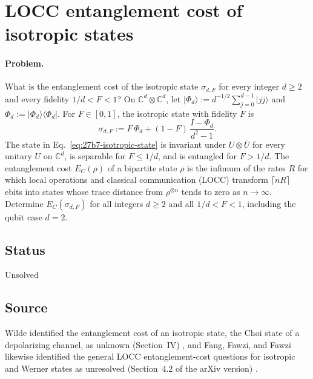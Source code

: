 \section{LOCC entanglement cost of isotropic states}
\label{sec:op_27b7826ed57e893a}

\paragraph{Problem.}
What is the entanglement cost of the isotropic state $\sigma_{d,F}$ for every
integer $d\geq2$ and every fidelity $1/d<F<1$?  On
$\mathbb C^d\otimes\mathbb C^d$, let
$\lvert\Phi_d\rangle:=d^{-1/2}\sum_{j=0}^{d-1}\lvert jj\rangle$ and
$\Phi_d:=\lvert\Phi_d\rangle\!\langle\Phi_d\rvert$.  For $F\in[0,1]$, the
isotropic state with fidelity $F$ is
\begin{equation}
  \sigma_{d,F}:=F\,\Phi_d+(1-F)\,\frac{I-\Phi_d}{d^2-1}.
  \label{eq:27b7-isotropic-state}
\end{equation}
The state in Eq.~\eqref{eq:27b7-isotropic-state} is invariant under
$U\otimes\overline U$ for every unitary $U$ on $\mathbb C^d$, is separable for
$F\leq1/d$, and is entangled for $F>1/d$.  The entanglement cost $E_C(\rho)$
of a bipartite state $\rho$ is the infimum of the rates $R$ for which local
operations and classical communication (LOCC) transform $\lceil nR\rceil$
ebits into states whose trace distance from $\rho^{\otimes n}$ tends to zero
as $n\to\infty$.  Determine $E_C(\sigma_{d,F})$ for all integers $d\geq2$ and
all $1/d<F<1$, including the qubit case $d=2$.

\subsection*{Status}

Unsolved

\subsection*{Source}

Wilde identified the entanglement cost of an isotropic state, the Choi state
of a depolarizing channel, as unknown (Section~IV)
, and Fang, Fawzi, and Fawzi likewise identified the general LOCC
entanglement-cost questions for isotropic and Werner states as unresolved
(Section~4.2 of the arXiv version)
.

